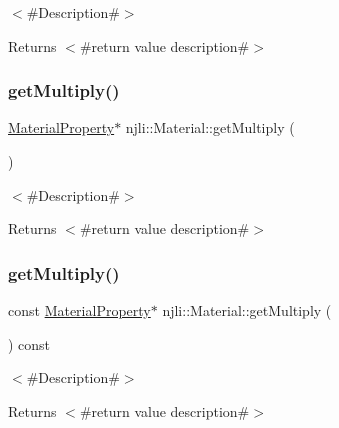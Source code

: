 $<$\#\+Description\#$>$

\begin{DoxyReturn}{Returns}
$<$\#return value description\#$>$ 
\end{DoxyReturn}
\mbox{\label{classnjli_1_1_material_abb8dbb0fcff241cc7d73886b57223834}} 
\subsubsection{\texorpdfstring{get\+Multiply()}{getMultiply()}\hspace{0.1cm}{\footnotesize\ttfamily [1/2]}}
{\footnotesize\ttfamily \mbox{\hyperlink{classnjli_1_1_material_property}{Material\+Property}}$\ast$ njli\+::\+Material\+::get\+Multiply (\begin{DoxyParamCaption}{ }\end{DoxyParamCaption})}

$<$\#\+Description\#$>$

\begin{DoxyReturn}{Returns}
$<$\#return value description\#$>$ 
\end{DoxyReturn}
\mbox{\label{classnjli_1_1_material_ad8aec4a344a8853e573c0d4c56c31fdb}} 
\subsubsection{\texorpdfstring{get\+Multiply()}{getMultiply()}\hspace{0.1cm}{\footnotesize\ttfamily [2/2]}}
{\footnotesize\ttfamily const \mbox{\hyperlink{classnjli_1_1_material_property}{Material\+Property}}$\ast$ njli\+::\+Material\+::get\+Multiply (\begin{DoxyParamCaption}{ }\end{DoxyParamCaption}) const}

$<$\#\+Description\#$>$

\begin{DoxyReturn}{Returns}
$<$\#return value description\#$>$ 
\end{DoxyReturn}
\mbox{\label{classnjli_1_1_material_ad41266885be835f3ee602311e20877a4}} 
